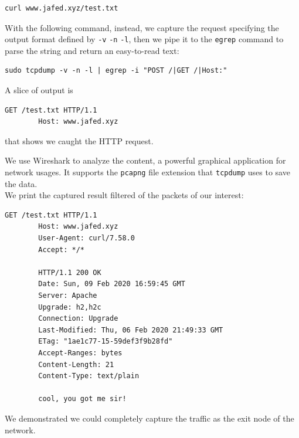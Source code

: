 \documentclass[12pt]{article}
\begin{document}
	\begin{lstlisting}[frame=single]
		curl www.jafed.xyz/test.txt
	\end{lstlisting}
	
	With the following command, instead, we capture the request specifying the output format defined by \lstinline{-v} \lstinline{-n} \lstinline{-l}, then we pipe it to the \lstinline{egrep} command to parse the string and return an easy-to-read text:\\
	
	\begin{lstlisting}[frame=single]
		sudo tcpdump -v -n -l | egrep -i "POST /|GET /|Host:"
	\end{lstlisting}

	A slice of output is\\
	
	\begin{lstlisting}[frame=single]
		GET /test.txt HTTP/1.1
        Host: www.jafed.xyz
	\end{lstlisting}

	that shows we caught the HTTP request.
	
	We use Wireshark to analyze the content, a powerful graphical application for network usages. It supports the \lstinline{pcapng} file extension that \lstinline{tcpdump} uses to save the data.\\
	We print the captured result filtered of the packets of our interest:\\
	
	\begin{lstlisting}[frame=single]
		GET /test.txt HTTP/1.1
		Host: www.jafed.xyz
		User-Agent: curl/7.58.0
		Accept: */*

		HTTP/1.1 200 OK
		Date: Sun, 09 Feb 2020 16:59:45 GMT
		Server: Apache
		Upgrade: h2,h2c
		Connection: Upgrade
		Last-Modified: Thu, 06 Feb 2020 21:49:33 GMT
		ETag: "1ae1c77-15-59def3f9b28fd"
		Accept-Ranges: bytes
		Content-Length: 21
		Content-Type: text/plain

		cool, you got me sir!
	\end{lstlisting}

	We demonstrated we could completely capture the traffic as the exit node of the network. 
\end{document}
